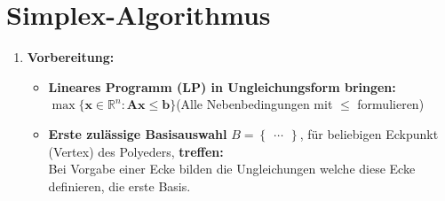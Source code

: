 \section{Simplex-Algorithmus}

\begin{enumerate}
\item \textbf{Vorbereitung:}\\
	\begin{itemize}
	\item \textbf{Lineares Programm (LP) in Ungleichungsform bringen:}\\
	$\boxed{\max\{\mathbf{x}\in\mathbb{R}^n:\mathbf{Ax}\leq \mathbf{b}\}}$\quad(Alle Nebenbedingungen mit $\leq$ formulieren)
	\item \textbf{Erste zulässige Basisauswahl} $B=\begin{Bmatrix}\ldots\end{Bmatrix}$, für beliebigen Eckpunkt (Vertex) des Polyeders, \textbf{treffen:}\\
	Bei Vorgabe einer Ecke bilden die Ungleichungen welche diese Ecke definieren, die erste Basis.
	\end{itemize}
	
	\vspace{0.3cm}
	

\end{enumerate}
